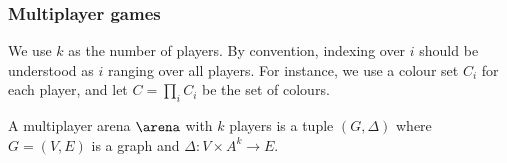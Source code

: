 
\subsubsection*{Multiplayer games}

We use $k$ as the number of players. 
By convention, indexing over $i$ should be understood as $i$ ranging over all players.
For instance, we use a colour set $C_i$ for each player, and let $C = \prod_i C_i$ be the set of colours.

\begin{definition}
A multiplayer arena $\arena$ with $k$ players is a tuple $(G,\Delta)$ where $G = (V,E)$ is a graph
and $\Delta : V \times A^k \to E$.
\end{definition}
